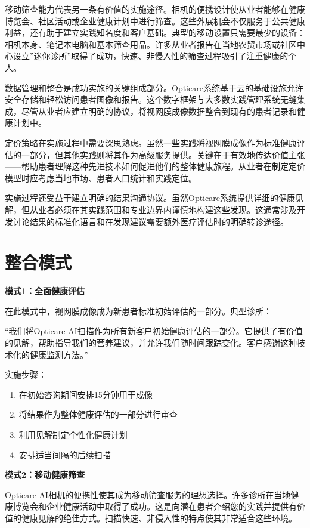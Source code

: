 \documentclass[
  Letterpaper,
]{scrbook}
\providecommand{\tightlist}{%
  \setlength{\itemsep}{0pt}\setlength{\parskip}{0pt}}\usepackage{longtable,booktabs,array}
\begin{document}
移动筛查能力代表另一条有价值的实施途径。相机的便携设计使从业者能够在健康博览会、社区活动或企业健康计划中进行筛查。这些外展机会不仅服务于公共健康利益，还有助于建立实践知名度和客户基础。典型的移动设置只需要最少的设备：相机本身、笔记本电脑和基本筛查用品。许多从业者报告在当地农贸市场或社区中心设立''迷你诊所''取得了成功，快速、非侵入性的筛查过程吸引了注重健康的个人。

数据管理和整合是成功实施的关键组成部分。Opticare系统基于云的基础设施允许安全存储和轻松访问患者图像和报告。这个数字框架与大多数实践管理系统无缝集成，尽管从业者应建立明确的协议，将视网膜成像数据整合到现有的患者记录和健康计划中。

定价策略在实施过程中需要深思熟虑。虽然一些实践将视网膜成像作为标准健康评估的一部分，但其他实践则将其作为高级服务提供。关键在于有效地传达价值主张------帮助患者理解这种先进技术如何促进他们的整体健康旅程。从业者在制定定价模型时应考虑当地市场、患者人口统计和实践定位。

实施过程还受益于建立明确的结果沟通协议。虽然Opticare系统提供详细的健康见解，但从业者必须在其实践范围和专业边界内谨慎地构建这些发现。这通常涉及开发讨论结果的标准化语言和在发现建议需要额外医疗评估时的明确转诊途径。

\section{整合模式}\label{ux6574ux5408ux6a21ux5f0f}

\textbf{模式1：全面健康评估}

在此模式中，视网膜成像成为新患者标准初始评估的一部分。典型诊所：

``我们将Opticare
AI扫描作为所有新客户初始健康评估的一部分。它提供了有价值的见解，帮助指导我们的营养建议，并允许我们随时间跟踪变化。客户感谢这种技术化的健康监测方法。''

实施步骤：

\begin{enumerate}
\def\labelenumi{\arabic{enumi}.}
\tightlist
\item
  在初始咨询期间安排15分钟用于成像
\item
  将结果作为整体健康评估的一部分进行审查
\item
  利用见解制定个性化健康计划
\item
  安排适当间隔的后续扫描
\end{enumerate}

\textbf{模式2：移动健康筛查}

Opticare
AI相机的便携性使其成为移动筛查服务的理想选择。许多诊所在当地健康博览会和企业健康活动中取得了成功。这是向潜在患者介绍您的实践并提供有价值的健康见解的绝佳方式。扫描快速、非侵入性的特点使其非常适合这些环境。
\end{document}
